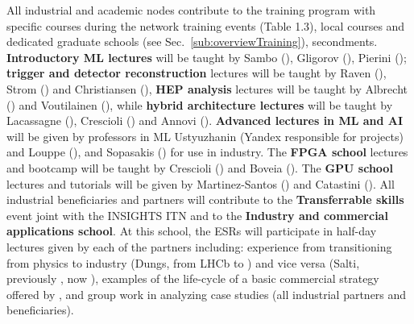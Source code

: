 All industrial and academic nodes contribute to the training program with specific courses during the network training events (Table 1.3), local courses and dedicated graduate schools (see Sec.~\ref{sub:overviewTraining}), secondments. \textbf{Introductory ML lectures} will be taught by Sambo (\fleetmaticsentity), Gligorov (\cnrsentity), Pierini (\cernentity); \textbf{trigger and detector reconstruction} lectures will be taught by Raven (\nikhefentity), Strom (\oregonentity) and Christiansen (\lundentity), \textbf{HEP analysis} lectures will be taught by Albrecht (\dortmundentity) and Voutilainen (\helsinkientity), while \textbf{hybrid architecture lectures} will be taught by Lacassagne (\sorbonneentity), Crescioli (\cnrsentity) and Annovi (\pisaentity).
\textbf{Advanced lectures in ML and AI} will be given by professors in ML Ustyuzhanin (Yandex responsible for \cernentity projects) and Louppe (\liegesentity), and Sopasakis (\ximantisentity) for use in industry. 
The \textbf{FPGA school} lectures and bootcamp will be taught by Crescioli (\cnrsentity) and Boveia (\cernentity). 
The \textbf{GPU school} lectures and tutorials will be given by Martinez-Santos (\santiagoentity) and Catastini (\lightboxentity). 
All industrial beneficiaries and partners will contribute to the \textbf{Transferrable skills} event joint with the INSIGHTS ITN and to the \textbf{Industry and commercial applications school}. 
At this school, the ESRs will participate in half-day lectures given by each of the partners including: experience from transitioning from physics to industry (Dungs, from LHCb to \pointeightentity) and vice versa (Salti, previously \fleetmaticsentity, now \uniboentity), examples of the life-cycle of a basic commercial strategy offered by \lightboxentity, and group work in analyzing case studies (all industrial partners and beneficiaries). 

